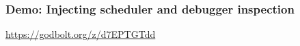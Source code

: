 \documentclass[aspectratio=169]{beamer}
\begin{document}
\begin{frame}
  \frametitle{Demo: Injecting scheduler and debugger inspection}
  
  \href{https://godbolt.org/z/d7EPTGTdd}{https://godbolt.org/z/d7EPTGTdd}
  
  \vspace{5pt}
  
  
\end{frame}
\end{document}
